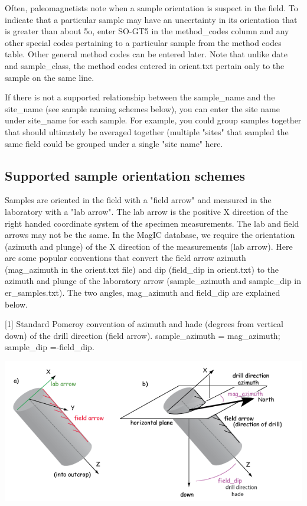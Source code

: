 \documentclass[11pt]{book}
\begin{document}
{{Often, paleomagnetists note when a sample orientation is suspect in the field. To indicate that a particular sample may have an uncertainty in its orientation that is greater than about 5o, enter SO-GT5 in the method_codes column and any other special codes pertaining to a particular sample from the method codes table. Other general method codes can be entered later. Note that unlike date and sample_class, the method codes entered in orient.txt pertain only to the sample on the same line.

If there is not a supported relationship between the sample_name and the site_name (see sample naming schemes below), you can enter the site name under site_name for each sample. For example, you could group samples together that should ultimately be averaged together (multiple "sites" that sampled the same field could be grouped under a single "site name" here.


\subsection{Supported sample orientation schemes}

Samples are oriented in the field with a "field arrow" and measured in the laboratory with a "lab arrow". The lab arrow is the positive X direction of the right handed coordinate system of the specimen measurements. The lab and field arrows may not be the same. In the MagIC database, we require the orientation (azimuth and plunge) of the X direction of the measurements (lab arrow). Here are some popular conventions that convert the field arrow azimuth (mag_azimuth in the orient.txt file) and dip (field_dip in orient.txt) to the azimuth and plunge of the laboratory arrow (sample_azimuth and sample_dip in er_samples.txt). The two angles, mag_azimuth and field_dip are explained below.

[1] Standard Pomeroy convention of azimuth and hade (degrees from vertical down) of the drill direction (field arrow). sample_azimuth = mag_azimuth; sample_dip =-field_dip.

  \includegraphics[width=15cm]{EPSfiles/pomeroy.png}
  
}}
\end{document}
